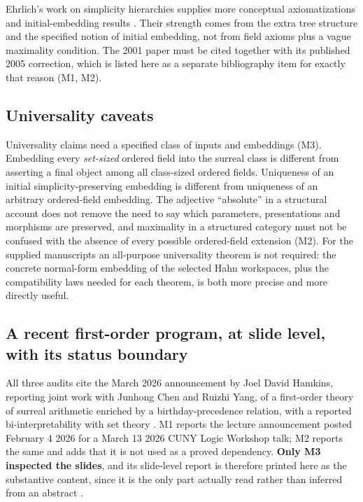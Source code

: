 \documentclass[11pt,letterpaper]{article}
\numberwithin{equation}{section}
\theoremstyle{definition}
\theoremstyle{remark}
\begin{document}
Ehrlich's work on simplicity hierarchies supplies more conceptual
axiomatizations and initial-embedding results
\cite{found:Ehrlich2001,found:EhrlichCorrection,found:EhrlichKaplanII}. Their
strength comes from the extra tree structure and the specified notion of initial
embedding, not from field axioms plus a vague maximality condition. The 2001
paper must be cited together with its published 2005 correction, which is listed
here as a separate bibliography item for exactly that reason (M1, M2).

\subsection{Universality caveats}
\label{found:sub:universality}
Universality claims need a specified class of inputs and embeddings (M3).
Embedding every \emph{set-sized} ordered field into the surreal class is
different from asserting a final object among all class-sized ordered fields.
Uniqueness of an initial simplicity-preserving embedding is different from
uniqueness of an arbitrary ordered-field embedding. The adjective ``absolute'' in
a structural account does not remove the need to say which parameters,
presentations and morphisms are preserved, and maximality in a structured
category must not be confused with the absence of every possible ordered-field
extension (M2). For the supplied manuscripts an all-purpose universality theorem
is not required: the concrete normal-form embedding of the selected Hahn
workspaces, plus the compatibility laws needed for each theorem, is both more
precise and more directly useful.

\subsection{A recent first-order program, at slide level, with its status boundary}
\label{found:sub:announcement}
All three audits cite the March 2026 announcement by Joel David Hamkins,
reporting joint work with Junhong Chen and Ruizhi Yang, of a first-order theory
of surreal arithmetic enriched by a birthday-precedence relation, with a reported
bi-interpretability with set theory \cite{found:Hamkins2026}. M1 reports the
lecture announcement posted February 4 2026 for a March 13 2026 CUNY Logic
Workshop talk; M2 reports the same and adds that it is not used as a proved
dependency. \textbf{Only M3 inspected the slides}, and its slide-level report is
therefore printed here as the substantive content, since it is the only part
actually read rather than inferred from an abstract
\cite{found:Hamkins2026Slides}.
\end{document}

